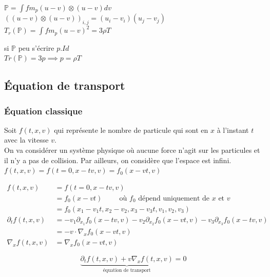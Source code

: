 \documentclass[12pt,a4paper]{article}
\begin{document}
	$\mathbb P = \displaystyle \int  fm_p(u-v) \otimes (u-v) dv$ \hspace{1cm} $\left((u-v)\otimes (u-v)\right)_{i,j} = (u_i-v_i)(u_j-v_j)$\\
	
	$T_r(\mathbb P) = \displaystyle\int fm_p(u-v)^2 = 3\rho T$ \hspace{1cm} \begin{minipage}[t]{10cm}
		si $\mathbb{P}$ peu s'écrire $p.Id$\\
		$Tr(\mathbb P)=3p \implies p = \rho T$
	\end{minipage}
	
\subsection{Équation de transport}

\subsubsection{Équation classique}

Soit $f(t,x,v)$ qui représente le nombre de particule qui sont en $x$ à l'instant $t$ avec la vitesse $v$.\\

On va considérer un système physique où aucune force n'agit sur les particules et il n'y a pas de collision. Par ailleurs, on considère  que l'espace est infini.\\

$f(t,x,v) = f(t=0,x-tv,v) = f_0(x-vt,v)$

\[
\begin{aligned}
	f(t,x,v) & = f(t=0,x-tv,v) \\
	&= f_0(x-vt) \hspace{1cm} \text{où $f_0$ dépend uniquement de $x$ et $v$}\\
	&=f_0(x_1-v_1t,x_2-v_2,x_3-v_3t,v_1,v_2,v_3) \\
	\partial_t f(t,x,v) & = -v_1\partial_{x_1} f_0(x-tv,v)-v_2\partial_{x_2}f_0(x-vt,v) - v_3\partial_{x_3}f_0(x-tv,v) \\
	&= -v\cdot\nabla_x f_0(x-vt,v) \\
	\nabla_x f(t,x,v) &= \nabla_x f_0(x-vt,v)
\end{aligned}
\]

\[
\underbrace{\partial_t f(t,x,v) + v\nabla_x f(t,x,v)}_{\text{équation de transport}} = 0
\]
	
\end{document}
